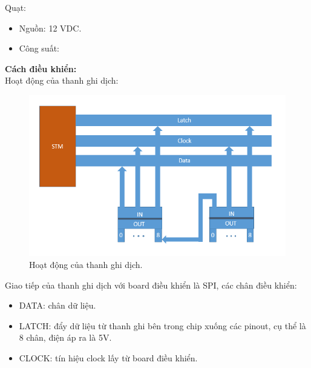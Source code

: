 \documentclass[a4paper,12pt,oneside]{article}
\begin{document}
Quạt:
\begin{itemize}
\item Nguồn: 12 VDC. 
\item Công suất: 
\end{itemize}


\noindent \textbf{Cách điều khiển:}\\
\noindent Hoạt động của thanh ghi dịch:\\
\begin{center}
\begin{figure}[h!]
\begin{center}
\includegraphics[scale=0.8]{hinh/stm_register.PNG}
\end{center}
\caption{Hoạt động của thanh ghi dịch.}
\end{figure}
\end{center}

\noindent Giao tiếp của thanh ghi dịch với board điều khiển là SPI, các chân điều khiển:
\begin{itemize}
\item DATA: chân dữ liệu.
\item LATCH: đẩy dữ liệu từ thanh ghi bên trong chip xuống các pinout, cụ thể là 8 chân, điện áp ra là 5V.
\item CLOCK: tín hiệu clock lấy từ board điều khiển.
\end{itemize}
\end{document}
